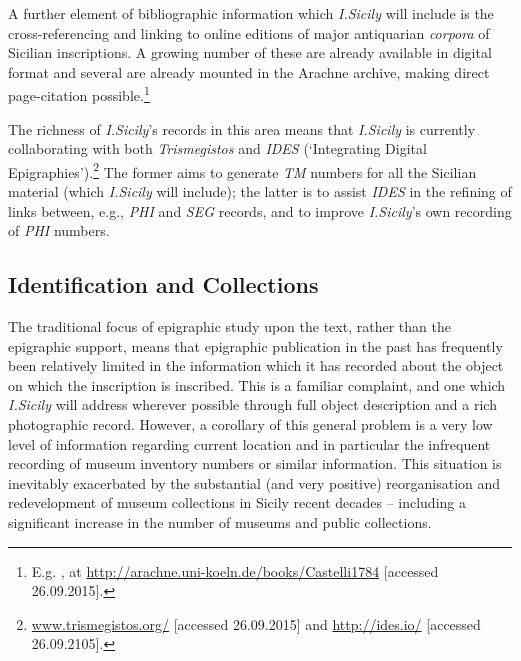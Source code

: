 \documentclass[amsthm,ebook]{saparticle}
\begin{document}
A further element of bibliographic information which \emph{I.Sicily} will include is the cross-referencing and linking to
online editions of major antiquarian \emph{corpora} of Sicilian inscriptions. A growing number of these are already available
in digital format and several are already mounted in the Arachne archive, making direct page-citation
possible.\footnote{ E.g. \citet{Castelli:1784aa}, at \url{http://arachne.uni-koeln.de/books/Castelli1784} [accessed 26.09.2015].}

The richness of \emph{I.Sicily}’s records in this area means that \emph{I.Sicily} is currently collaborating with both \emph{Trismegistos} and
\emph{IDES} (`Integrating Digital Epigraphies').\footnote{\url{www.trismegistos.org/} [accessed 26.09.2015] and \url{http://ides.io/}
[accessed 26.09.2105].} The former aims to generate \emph{TM} numbers for all the Sicilian material (which \emph{I.Sicily} will
include); the latter is to assist \emph{IDES} in the refining of links between, e.g., \emph{PHI} and \emph{SEG} records, and to improve
\emph{I.Sicily}’s own recording of \emph{PHI} numbers.




\subsection{Identification and Collections}


\noindent The traditional focus of epigraphic study upon the text, rather than the epigraphic support, means that epigraphic
publication in the past has frequently been relatively limited in the information which it has recorded about the
object on which the inscription is inscribed. This is a familiar complaint, and one which \emph{I.Sicily} will address
wherever possible through full object description and a rich photographic record. However, a corollary of this general
problem is a very low level of information regarding current location and in particular the infrequent recording of
museum inventory numbers or similar information. This situation is inevitably exacerbated by the substantial (and very
positive) reorganisation and redevelopment of museum collections in Sicily recent decades – including a significant
increase in the number of museums and public collections.
\end{document}
